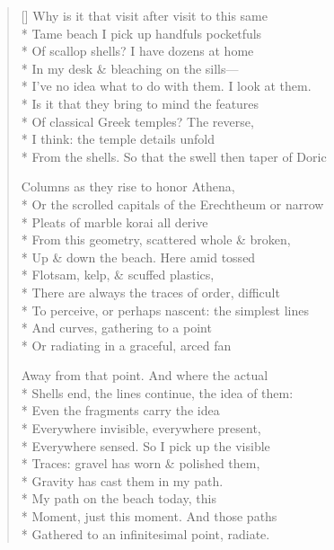 \label{ch:a_map_of_the_world}
\settowidth{\versewidth}{From the shells.  So that the swell then taper of Doric}
\begin{verse}[\versewidth]
Why is it that visit after visit to this same\\*
Tame beach I pick up handfuls pocketfuls\\*
Of scallop shells?  I have dozens at home\\*
In my desk \& bleaching on the sills---\\*
I've no idea what to do with them. I look at them.\\*
Is it that they bring to mind the features\\*
Of classical Greek temples? The reverse,\\*
I think: the temple details unfold\\*
From the shells.  So that the swell then taper of Doric

Columns as they rise to honor Athena,\\*
Or the scrolled capitals of the Erechtheum or narrow\\*
Pleats of marble korai all derive\\*
From this geometry, scattered whole \& broken,\\*
Up \& down the beach. Here amid tossed\\*
Flotsam, kelp, \& scuffed plastics,\\*
There are always the traces of order, difficult\\*
To perceive, or perhaps nascent: the simplest lines\\*
And curves, gathering to a point\\*
Or radiating in a graceful, arced fan

Away from that point.  And where the actual\\*
Shells end, the lines continue, the idea of them:\\*
Even the fragments carry the idea\\*
Everywhere invisible, everywhere present,\\*
Everywhere sensed. So I pick up the visible\\*
Traces: gravel has worn \& polished them,\\*
Gravity has cast them in my path.\\*
My path on the beach today, this \\*
Moment, just this moment.  And those paths\\*
Gathered to an infinitesimal point, radiate.
\end{verse}
